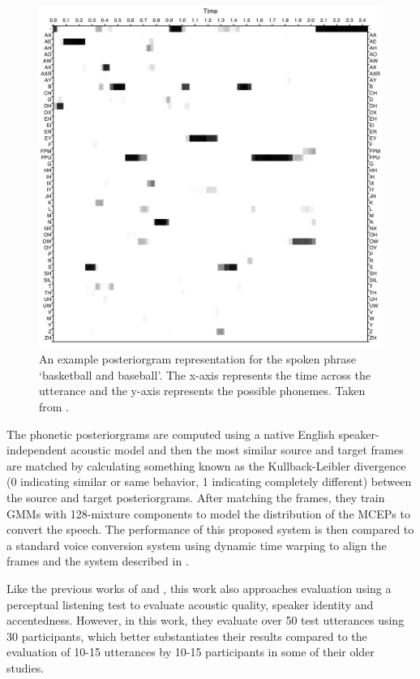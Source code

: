 \documentclass
[
    a4paper,
    twoside,
    12pt,
]
{report}
\begin{document}
\begin{figure}[]
\centering
\includegraphics[scale=0.22]{img/phonetic-postgram.png}
\caption{An example posteriorgram representation for the spoken phrase `basketball and baseball'. The x-axis represents the time across the utterance and the y-axis represents the possible phonemes. Taken from \textcite{hazen2009}.}
\label{fig:phonetic-postgram}
\end{figure}

The phonetic posteriorgrams are computed using a native English
speaker-independent acoustic model and then the most similar source and
target frames are matched by calculating something known as the
Kullback-Leibler divergence (0 indicating similar or same behavior, 1
indicating completely different) between the source and target
posteriorgrams. After matching the frames, they train GMMs with
128-mixture components to model the distribution of the MCEPs to convert
the speech. The performance of this proposed system is then compared to
a standard voice conversion system using dynamic time warping to align
the frames and the system described in \textcite{aryal2014}.

Like the previous works of \textcite{aryal2014} and
\textcite{aryal2015}, this work also approaches evaluation using a
perceptual listening test to evaluate acoustic quality, speaker identity
and accentedness. However, in this work, they evaluate over 50 test
utterances using 30 participants, which better substantiates their
results compared to the evaluation of 10-15 utterances by 10-15
participants in some of their older studies.
\end{document}
